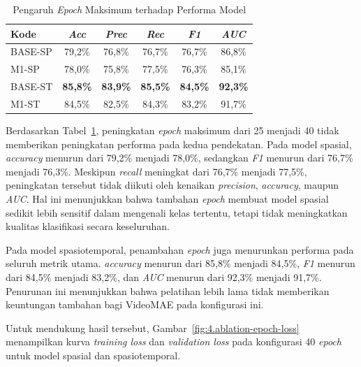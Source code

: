 \begin{table}[htbp]
\centering
\caption{Pengaruh \textit{Epoch} Maksimum terhadap Performa Model}
\label{table:4.ablation-epoch}
\begin{tabular}{lccccc}
\toprule
\textbf{Kode} &
\textbf{\textit{Acc}} &
\textbf{\textit{Prec}} &
\textbf{\textit{Rec}} &
\textbf{\textit{F1}} &
\textbf{\textit{AUC}} \\
\midrule
BASE-SP & 79,2\% & 76,8\% & 76,7\% & 76,7\% & 86,8\% \\
M1-SP & 78,0\% & 75,8\% & 77,5\% & 76,3\% & 85,1\% \\
BASE-ST & \textbf{85,8\%} & \textbf{83,9\%} & \textbf{85,5\%} & \textbf{84,5\%} & \textbf{92,3\%} \\
M1-ST & 84,5\% & 82,5\% & 84,3\% & 83,2\% & 91,7\% \\
\bottomrule
\end{tabular}
\end{table}

Berdasarkan Tabel~\ref{table:4.ablation-epoch}, peningkatan \textit{epoch} maksimum dari 25 menjadi 40 tidak memberikan peningkatan performa pada kedua pendekatan. Pada model spasial, \textit{accuracy} menurun dari 79,2\% menjadi 78,0\%, sedangkan \textit{F1} menurun dari 76,7\% menjadi 76,3\%. Meskipun \textit{recall} meningkat dari 76,7\% menjadi 77,5\%, peningkatan tersebut tidak diikuti oleh kenaikan \textit{precision}, \textit{accuracy}, maupun \textit{AUC}. Hal ini menunjukkan bahwa tambahan \textit{epoch} membuat model spasial sedikit lebih sensitif dalam mengenali kelas tertentu, tetapi tidak meningkatkan kualitas klasifikasi secara keseluruhan.

Pada model spasiotemporal, penambahan \textit{epoch} juga menurunkan performa pada seluruh metrik utama. \textit{accuracy} menurun dari 85,8\% menjadi 84,5\%, \textit{F1} menurun dari 84,5\% menjadi 83,2\%, dan \textit{AUC} menurun dari 92,3\% menjadi 91,7\%. Penurunan ini menunjukkan bahwa pelatihan lebih lama tidak memberikan keuntungan tambahan bagi VideoMAE pada konfigurasi ini.

Untuk mendukung hasil tersebut, Gambar~\ref{fig:4.ablation-epoch-loss} menampilkan kurva \textit{training loss} dan \textit{validation loss} pada konfigurasi 40 \textit{epoch} untuk model spasial dan spasiotemporal.

